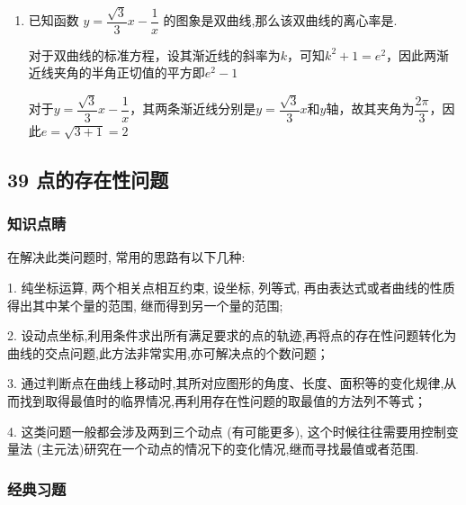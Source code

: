 \begin{enumerate}
\begin{jieda}
        故$\dfrac{2ac}{c-a} > a+c$，即$2e > e^2 - 1$，故$e \in (1, \sqrt{2}+1)$
    \end{jieda}
    \item 已知函数 $y = \dfrac{\sqrt{3}}{3}x - \dfrac{1}{x}$ 的图象是双曲线,那么该双曲线的离心率是.
    \begin{jieda}
        对于双曲线的标准方程，设其渐近线的斜率为$k$，可知$k^2+1 = e^2$，因此两渐近线夹角的半角正切值的平方即$e^2-1$

        对于$y = \dfrac{\sqrt{3}}{3}x - \dfrac{1}{x}$，其两条渐近线分别是$y = \dfrac{\sqrt{3}}{3}x$和$y$轴，故其夹角为$\dfrac{2\pi}{3}$，因此$e=\sqrt{3+1} = 2$
    \end{jieda}
\end{enumerate}

\subsection*{39 点的存在性问题}

\subsubsection*{知识点睛}

在解决此类问题时, 常用的思路有以下几种:

1. 纯坐标运算, 两个相关点相互约束, 设坐标, 列等式, 再由表达式或者曲线的性质得出其中某个量的范围, 继而得到另一个量的范围;

2. 设动点坐标,利用条件求出所有满足要求的点的轨迹,再将点的存在性问题转化为曲线的交点问题,此方法非常实用,亦可解决点的个数问题；

3. 通过判断点在曲线上移动时,其所对应图形的角度、长度、面积等的变化规律,从而找到取得最值时的临界情况,再利用存在性问题的取最值的方法列不等式；

4. 这类问题一般都会涉及两到三个动点 (有可能更多), 这个时候往往需要用控制变量法 (主元法)研究在一个动点的情况下的变化情况,继而寻找最值或者范围.

\subsubsection*{经典习题}

